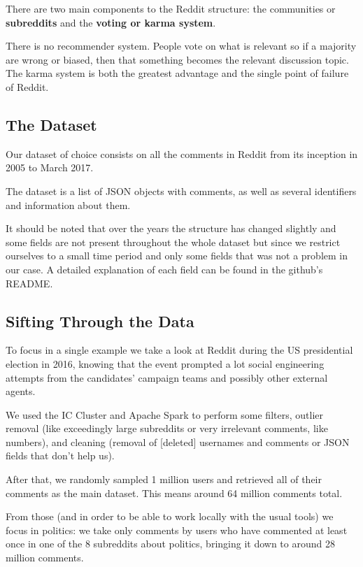 \documentclass[11pt]{article}
\begin{document}
There are two main components to the Reddit structure: the communities or \textbf{subreddits} and the \textbf{voting or karma system}.

There is no recommender system. People vote on what is relevant so if a majority are wrong or biased, then that something becomes the relevant discussion topic. The karma system is both the greatest advantage and the single point of failure of Reddit.

\subsection{The Dataset}

Our dataset of choice consists on all the comments in Reddit from its inception in 2005 to March 2017.

The dataset is a list of JSON objects with comments, as well as several identifiers and information about them.

It should be noted that over the years the structure has changed slightly and some fields are not present throughout the whole dataset but since we restrict ourselves to a small time period and only some fields that was not a problem in our case.
A detailed explanation of each field can be found in the github's README.

\subsection{Sifting Through the Data}

To focus in a single example we take a look at Reddit during the US presidential election in 2016, knowing that the event prompted a lot social engineering attempts from the candidates' campaign teams and possibly other external agents. 

We used the IC Cluster and Apache Spark to perform some filters, outlier removal (like exceedingly large subreddits or very irrelevant comments, like numbers), and cleaning (removal of [deleted] usernames and comments or JSON fields that don't help us).

After that, we randomly sampled 1 million users and retrieved all of their comments as the main dataset. This means around 64 million comments total.

From those (and in order to be able to work locally with the usual tools) we focus in politics: we take only comments by users who have commented at least once in one of the 8 subreddits about politics, bringing it down to around 28 million comments.
\end{document}
